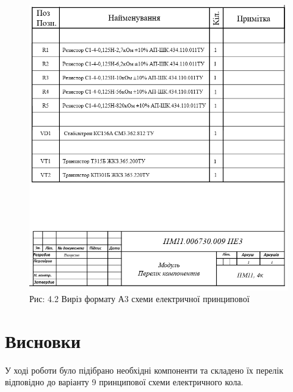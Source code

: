 \documentclass[a4paper]{article}
\begin{document}
\newpage

\begin{figure}[h]
    \centering
    \includegraphics[width=1\textwidth]{imgs/PW4.png}
    \caption*{Рис: 4.2 Виріз формату А3 схеми електричної принципової}
\end{figure}

\section*{Висновки}
У ході роботи було підібрано необхідні компоненти та складено їх перелік відповідно до варіанту 9 принципової схеми електричного кола.
\end{document}
